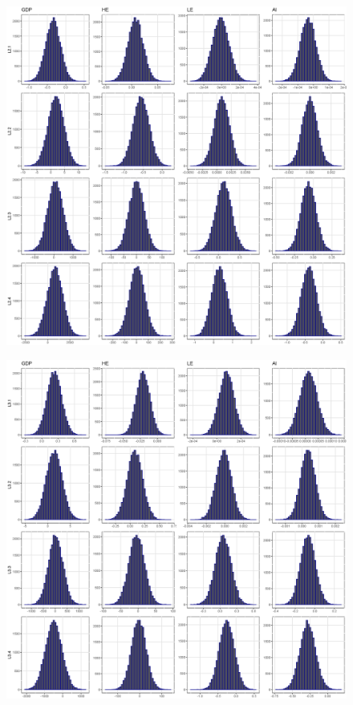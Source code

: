 \documentclass[11pt,preprint, authoryear]{elsarticle}
\let\origfigure\figure
\let\endorigfigure\endfigure
\renewenvironment{figure}[1][2] {
    \expandafter\origfigure\expandafter[H]
} {
    \endorigfigure
}
\numberwithin{equation}{section}
\numberwithin{figure}{section}
\numberwithin{table}{section}
\begin{document}
\begin{figure}
\begin{subfigure}[H]{0.49\textwidth}
         \includegraphics[width=\textwidth]{minn_CoefLag2.eps}
     \end{subfigure}
    \begin{subfigure}[H]{0.49\textwidth}
         \centering
         \includegraphics[width=\textwidth]{minn_CoefLag3.eps}
    \end{subfigure}
        \caption{Minnesota prior: Estimated BVAR(3) coefficients' posterior distributions using Gibbs sampling.}
        \label{posterior_minnesota}
\end{figure}
\end{document}
